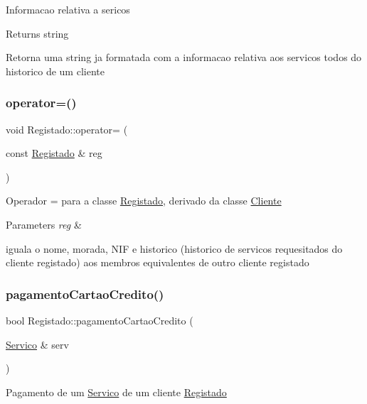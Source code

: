Informacao relativa a sericos

\begin{DoxyReturn}{Returns}
string
\end{DoxyReturn}
Retorna uma string ja formatada com a informacao relativa aos servicos todos do historico de um cliente \hypertarget{class_registado_a4570e0b507ef86f7fce56510f118a887}{}\label{class_registado_a4570e0b507ef86f7fce56510f118a887} 
\subsubsection{\texorpdfstring{operator=()}{operator=()}}
{\footnotesize\ttfamily void Registado\+::operator= (\begin{DoxyParamCaption}\item[{const \hyperlink{class_registado}{Registado} \&}]{reg }\end{DoxyParamCaption})}

Operador = para a classe \hyperlink{class_registado}{Registado}, derivado da classe \hyperlink{class_cliente}{Cliente} 
\begin{DoxyParams}{Parameters}
{\em reg} & \\
\hline
\end{DoxyParams}
iguala o nome, morada, N\+IF e historico (historico de servicos requesitados do cliente registado) aos membros equivalentes de outro cliente registado \hypertarget{class_registado_a1d6da4b2cbc8340fa79055a026d4ea44}{}\label{class_registado_a1d6da4b2cbc8340fa79055a026d4ea44} 
\subsubsection{\texorpdfstring{pagamento\+Cartao\+Credito()}{pagamentoCartaoCredito()}\hspace{0.1cm}{\footnotesize\ttfamily [1/2]}}
{\footnotesize\ttfamily bool Registado\+::pagamento\+Cartao\+Credito (\begin{DoxyParamCaption}\item[{\hyperlink{class_servico}{Servico} \&}]{serv }\end{DoxyParamCaption})\hspace{0.3cm}{\ttfamily [virtual]}}

Pagamento de um \hyperlink{class_servico}{Servico} de um cliente \hyperlink{class_registado}{Registado}


